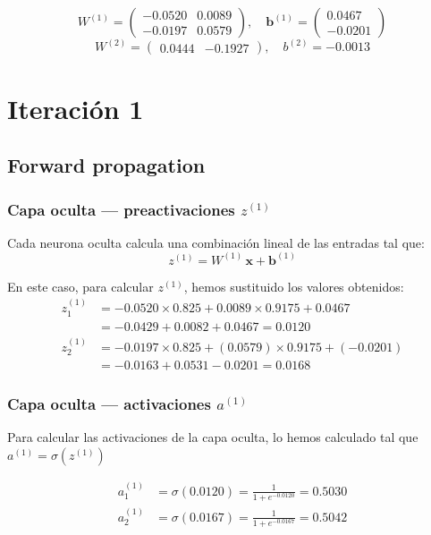 \documentclass{article}
\begin{document}
\[
  W^{(1)} = \begin{pmatrix} -0.0520 & 0.0089 \\ -0.0197 & 0.0579 \end{pmatrix}, \quad
  \mathbf{b}^{(1)} = \begin{pmatrix} 0.0467 \\ -0.0201 \end{pmatrix}
\]
\[
  W^{(2)} = \begin{pmatrix} 0.0444 & -0.1927\end{pmatrix}, \quad
  b^{(2)} = -0.0013
\]

\section*{Iteración 1}
 
\subsection*{Forward propagation}
 
\subsubsection*{Capa oculta --- preactivaciones $z^{(1)}$}
 
Cada neurona oculta calcula una combinación lineal de las entradas tal que:
\[
  z^{(1)} = W^{(1)}\,\mathbf{x} + \mathbf{b}^{(1)}
\]

En este caso, para calcular $z^{(1)}$, hemos sustituido los valores obtenidos:
\begin{align*}
  z^{(1)}_1 &= -0.0520 \times 0.825 + 0.0089 \times 0.9175 + 0.0467 \\
             &= -0.0429 + 0.0082 + 0.0467 = \mathbf{0.0120}
             \\[6pt]
  z^{(1)}_2 &= -0.0197 \times 0.825 + (0.0579) \times 0.9175 + (-0.0201) \\
             &= - 0.0163 + 0.0531 - 0.0201 = \mathbf{0.0168}
\end{align*}

\subsubsection*{Capa oculta --- activaciones $a^{(1)}$}
Para calcular las activaciones de la capa oculta, lo hemos calculado tal que $a^{(1)} = \sigma(z^{(1)})$
 
\begin{align*}
  a^{(1)}_1 &= \sigma(0.0120) = \frac{1}{1+e^{-0.0120}} = \mathbf{0.5030} \\
  a^{(1)}_2 &= \sigma(0.0167)  = \frac{1}{1+e^{-0.0167}}  = \mathbf{0.5042}
\end{align*}
\end{document}
